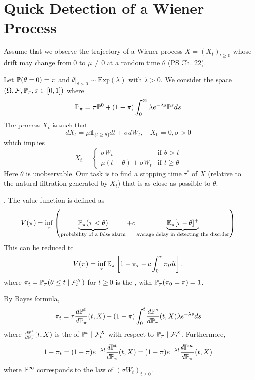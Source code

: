 \section{Quick Detection of a Wiener Process}

\begin{remark}
    Assume that we observe the trajectory of a Wiener process $X = (X_t)_{t \geq 0}$ whose drift may change from 0 to $\mu \neq 0$ at a random time $\theta$ (PS Ch. 22).
    
    Let $\mathbb P(\theta = 0) = \pi$ and $\theta |_{\theta > 0} \sim \text{Exp}(\lambda)$ with $\lambda > 0$. We consider the space $(\Omega, \mathcal{F}, \mathbb P_\pi, \pi \in [0,1])$ where
    \[ \mathbb P_\pi = \pi \mathbb P^0 + (1-\pi) \int_0^\infty \lambda e^{-\lambda s} \mathbb P^s ds \]
    The process $X_t$ is such that
    \[ dX_t = \mu \mathbb{1}_{\{t \geq \theta\}} dt + \sigma dW_t, \quad X_0 = 0, \sigma > 0 \]
    which implies
    \[ X_t = \begin{cases} \sigma W_t & \text{if } \theta > t \\ \mu(t-\theta) + \sigma W_t & \text{if } t \geq \theta \end{cases} \]
    Here $\theta$ is unobservable. Our task is to find a stopping time $\tau^*$ of $X$ (relative to the natural filtration generated by $X_t$) that is as close as possible to $\theta$.
\end{remark}

\begin{remark}
    .
    The value function is defined as
    \[ V(\pi) = \inf_\tau \left( \underbrace{\mathbb P_\pi(\tau < \theta)}_{\text{probability of a false alarm}} + c \underbrace{\mathbb E_\pi [\tau - \theta]^+}_{\text{average delay in detecting the disorder}} \right) \]
    This can be reduced to
    \[ V(\pi) = \inf_\tau \mathbb E_\pi \left[ 1 - \pi_\tau + c \int_0^\tau \pi_t dt \right], \]
    where $\pi_t = \mathbb P_\pi(\theta \leq t \mid \mathcal{F}_t^X)$ for $t \geq 0$ is the , with $\mathbb P_\pi(\pi_0 = \pi) = 1$.
    
    By Bayes formula,
    \[ \pi_t = \pi \frac{d\mathbb P^0}{d\mathbb P_\pi}(t, X) + (1-\pi) \int_0^t \frac{d\mathbb P^s}{d\mathbb P_\pi}(t, X) \lambda e^{-\lambda s} ds \]
    where $\frac{d\mathbb P^s}{d\mathbb P_\pi}(t, X)$ is the  of $\mathbb P^s \mid \mathcal{F}_t^X$ with respect to $\mathbb P_\pi \mid \mathcal{F}_t^X$.
    Furthermore,
    \[ 1 - \pi_t = (1-\pi) e^{-\lambda t} \frac{d\mathbb P^t}{d\mathbb P_\pi}(t, X) = (1-\pi) e^{-\lambda t} \frac{d\mathbb P^\infty}{d\mathbb P_\pi}(t, X) \]
    where $\mathbb P^\infty$ corresponds to the law of $(\sigma W_t)_{t \geq 0}$.
\end{remark}

